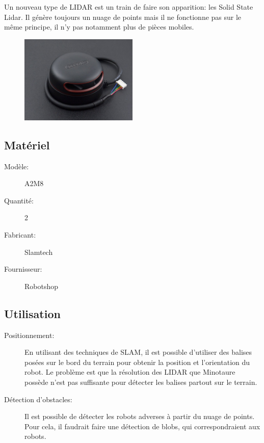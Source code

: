 \documentclass[a4paper, 11pt]{report}
\begin{document}
Un nouveau type de LIDAR est un train de faire son apparition: les Solid State Lidar. Il génère toujours un nuage de points mais il ne fonctionne pas sur le même principe, il n'y pas notamment plus de pièces mobiles. 

\begin{figure}[h!]
\begin{centering}
\includegraphics[width=0.5\textwidth]{images/RPLidar.jpg}
\par\end{centering}
\end{figure}

\subsection{Matériel}
\begin{description}
\item[Modèle:] A2M8
\item[Quantité:]2
\item[Fabricant:]Slamtech
\item[Fournisseur:]Robotshop
\end{description}


\subsection{Utilisation}
\begin{description}
\item[Positionnement:]En utilisant des techniques de SLAM, il est possible d'utiliser des balises posées sur le bord du terrain pour obtenir la position et l'orientation du robot. Le problème est que la résolution des LIDAR que Minotaure possède n'est pas suffisante pour détecter les balises partout sur le terrain.
\item[Détection d'obstacles:] Il est possible de détecter les robots adverses à partir du nuage de points. Pour cela, il faudrait faire une détection de blobs, qui correspondraient aux robots.
\end{description}
\end{document}

